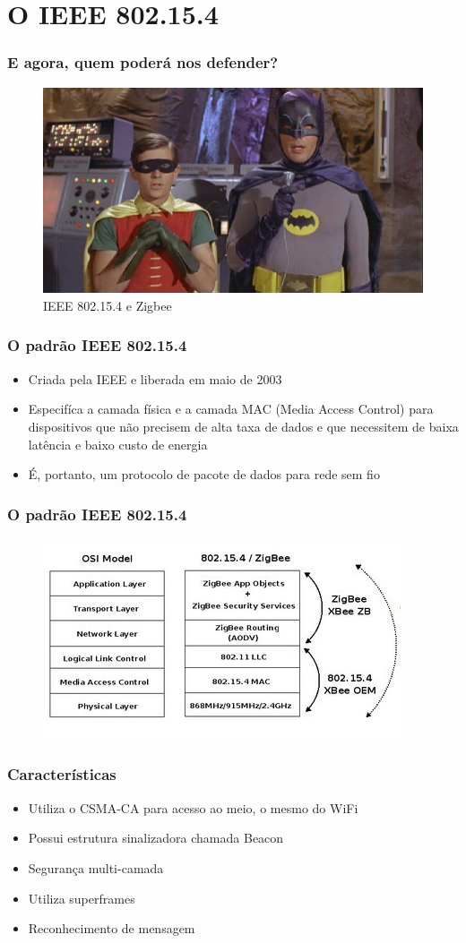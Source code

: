 \documentclass{beamer}
\begin{document}
  \section{O IEEE 802.15.4}
  \frame
  {
    \frametitle{E agora, quem poderá nos defender?}
     \begin{figure}[ht!]
	\centering
	\includegraphics[width=.7\textwidth]{figuras/batmanrobin}
	\caption{IEEE 802.15.4 e Zigbee}
	\label{fig:batmanrobin}
     \end{figure}
     
  }

  \frame
  {
    \frametitle{O padrão IEEE 802.15.4}
    \begin{itemize}
      \item Criada pela IEEE e liberada em maio de 2003
      \item Especifíca a camada física e a camada MAC (Media Access Control) para dispositivos que não precisem de alta taxa de dados 
	    e que necessitem de baixa latência e baixo custo de energia
      \item É, portanto, um protocolo de pacote de dados para rede sem fio
    \end{itemize}
  }

  \frame
  {
    \frametitle{O padrão IEEE 802.15.4}
        
    \begin{figure}[ht!]
	\centering
	\includegraphics[width=.6\textwidth]{figuras/padrao802154}
	\label{fig:padrao}
     \end{figure}
  }

  \frame
  {
    \frametitle{Características}
    \begin{itemize}
      \item Utiliza o CSMA-CA para acesso ao meio, o mesmo do WiFi
      \item Possui estrutura sinalizadora chamada Beacon
      \item Segurança multi-camada
      \item Utiliza superframes
      \item Reconhecimento de mensagem
    \end{itemize}
  }
\end{document}
